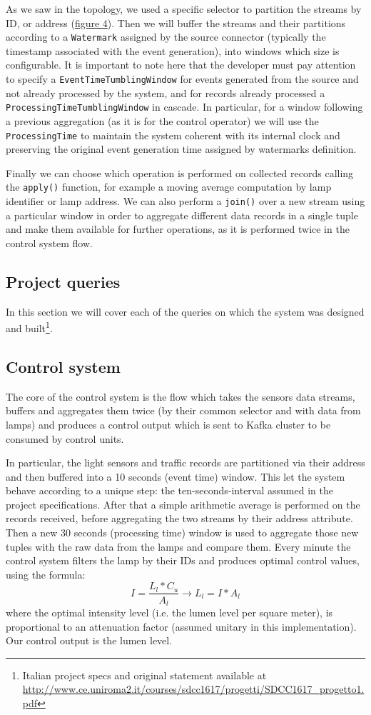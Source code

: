 As we saw in the topology, we used a specific selector to partition the streams by ID, or address (\hyperref[fig:ember_operation_flow]{figure 4}). Then we will buffer the streams and their partitions according to a \texttt{Watermark} assigned by the source connector (typically the timestamp associated with the event generation), into windows which size is configurable. It is important to note here that the developer must pay attention to specify a \texttt{EventTimeTumblingWindow} for events generated from the source and not already processed by the system, and for records already processed a \texttt{ProcessingTimeTumblingWindow} in cascade. In particular, for a window following a previous aggregation (as it is for the control operator) we will use the \texttt{ProcessingTime} to maintain the system coherent with its internal clock and preserving the original event generation time assigned by watermarks definition.

Finally we can choose which operation is performed on collected records calling the \texttt{apply()} function, for example a moving average computation by lamp identifier or lamp address. We can also perform a \texttt{join()} over a new stream using a particular window in order to aggregate different data records in a single tuple and make them available for further operations, as it is performed twice in the control system flow.

\subsection{Project queries}
In this section we will cover each of the queries on which the system was designed and built\footnote{Italian project specs and original statement available at \url{http://www.ce.uniroma2.it/courses/sdcc1617/progetti/SDCC1617_progetto1.pdf}}.

\subsection*{Control system}
The core of the control system is the flow which takes the sensors data streams, buffers and aggregates them twice (by their common selector and with data from lamps) and produces a control output which is sent to Kafka cluster to be consumed by control units.

In particular, the light sensors and traffic records are partitioned via their address and then buffered into a 10 seconds (event time) window. This let the system behave according to a unique step: the ten-seconds-interval assumed in the project specifications. After that a simple arithmetic average is performed on the records received, before aggregating the two streams by their address attribute. Then a new 30 seconds (processing time) window is used to aggregate those new tuples with the raw data from the lamps and compare them. Every minute the control system filters the lamp by their IDs and produces optimal control values, using the formula:
	$$I = \frac{L_l*C_u}{A_l} \rightarrow L_l = I * A_l$$
	where the optimal intensity level (i.e. the lumen level per square meter), is proportional to an attenuation factor (assumed unitary in this implementation). Our control output is the lumen level.

